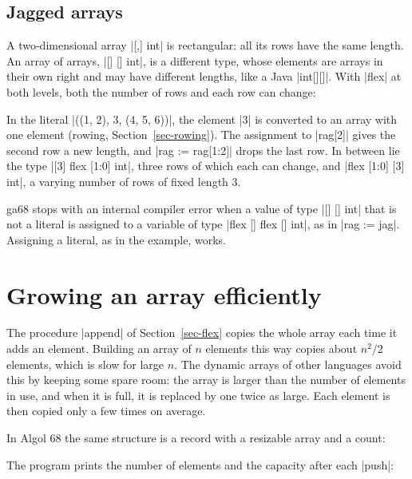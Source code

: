 \subsection*{Jagged arrays}

A two-dimensional array \code|[,] int| is rectangular: all its rows have
the same length. An array of arrays, \code|[] [] int|, is a different
type, whose elements are arrays in their own right and may have
different lengths, like a Java \code|int[][]|. With \code|flex| at both
levels, both the number of rows and each row can change:


In the literal \code|((1, 2), 3, (4, 5, 6))|, the element \code|3| is
converted to an array with one element (rowing,
Section~\ref{sec-rowing}). The assignment to \code|rag[2]| gives the second
row a new length, and \code|rag := rag[1:2]| drops the last row. In
between lie the type \code|[3] flex [1:0] int|, three rows of which each
can change, and \code|flex [1:0] [3] int|, a varying number of rows of
fixed length 3.

\begin{implnote}
ga68 stops with an internal compiler error when a value of type
\code|[] [] int| that is not a literal is assigned to a variable of type
\code|flex [] flex [] int|, as in \code|rag := jag|. Assigning a literal,
as in the example, works.
\end{implnote}

\section{Growing an array efficiently}\label{sec-vector}

The procedure \code|append| of Section~\ref{sec-flex} copies the whole
array each time it adds an element. Building an array of $n$ elements
this way copies about $n^2/2$ elements, which is slow for large $n$. The
dynamic arrays of other languages avoid this by keeping some spare room:
the array is larger than the number of elements in use, and when it is
full, it is replaced by one twice as large. Each element is then copied
only a few times on average.

In Algol 68 the same structure is a record with a resizable array and a
count:


\noindent The program prints the number of elements and the capacity
after each \code|push|:

